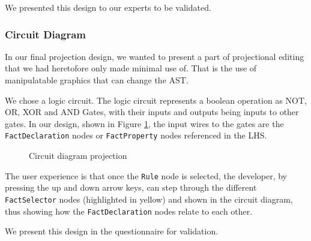 We presented this design to our experts to be validated.

\subsubsection{Circuit Diagram}
In our final projection design, we wanted to present a part of projectional editing that we had heretofore only made minimal use of.
That is the use of manipulatable graphics that can change the AST.

We chose a logic circuit. 
The logic circuit represents a boolean operation as NOT, OR, XOR and AND Gates, with their inputs and outputs being inputs to other gates.
In our design, shown in Figure \ref{fig:CircuitDiagramProjection}, the input wires to the gates are the \texttt{FactDeclaration} nodes or \texttt{FactProperty} nodes referenced in the LHS.

\begin{figure}[h]
    \centering
    \caption{Circuit diagram projection}
    \label{fig:CircuitDiagramProjection}
\end{figure}

The user experience is that once the \texttt{Rule} node is selected, the developer, by pressing the up and down arrow keys, can step through the different \texttt{FactSelector} nodes (highlighted in yellow) and shown in the circuit diagram, thus showing how the \texttt{FactDeclaration} nodes relate to each other.

We present this design in the questionnaire for validation.

